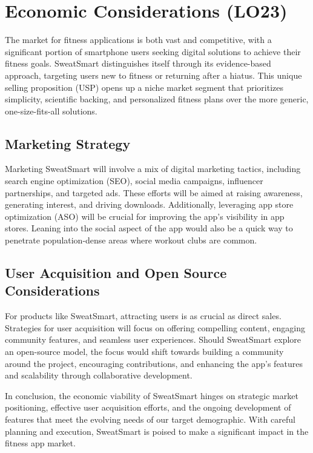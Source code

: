 \documentclass{article}
\begin{document}
\section{Economic Considerations (LO23)}

The market for fitness applications is both vast and competitive, with a significant portion of smartphone users seeking digital solutions to achieve their fitness goals. SweatSmart distinguishes itself through its evidence-based approach, targeting users new to fitness or returning after a hiatus. This unique selling proposition (USP) opens up a niche market segment that prioritizes simplicity, scientific backing, and personalized fitness plans over the more generic, one-size-fits-all solutions.

\subsection{Marketing Strategy}

Marketing SweatSmart will involve a mix of digital marketing tactics, including search engine optimization (SEO), social media campaigns, influencer partnerships, and targeted ads. These efforts will be aimed at raising awareness, generating interest, and driving downloads. Additionally, leveraging app store optimization (ASO) will be crucial for improving the app’s visibility in app stores. Leaning into the social aspect of the app would also be a quick way to penetrate population-dense areas where workout clubs are common. 

\subsection{User Acquisition and Open Source Considerations}

For products like SweatSmart, attracting users is as crucial as direct sales. Strategies for user acquisition will focus on offering compelling content, engaging community features, and seamless user experiences. Should SweatSmart explore an open-source model, the focus would shift towards building a community around the project, encouraging contributions, and enhancing the app’s features and scalability through collaborative development.

In conclusion, the economic viability of SweatSmart hinges on strategic market positioning, effective user acquisition efforts, and the ongoing development of features that meet the evolving needs of our target demographic. With careful planning and execution, SweatSmart is poised to make a significant impact in the fitness app market.
\end{document}
